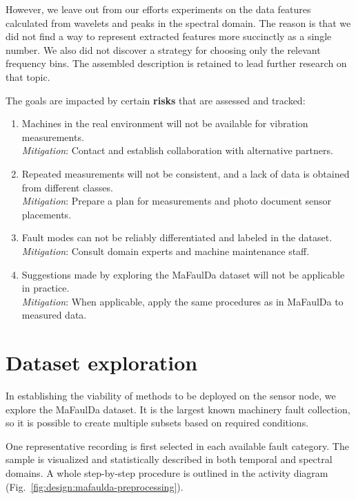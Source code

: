 However, we leave out from our efforts experiments on the data features calculated from wavelets and peaks in the spectral domain. The reason is that we did not find a way to represent extracted features more succinctly as a single number. We also did not discover a strategy for choosing only the relevant frequency bins. The assembled description is retained to lead further research on that topic.

The goals are impacted by certain \textbf{risks} that are assessed and tracked:

\begin{enumerate}[label=R-\arabic*., font=\bfseries]
\itemsep0pt
\item Machines in the real environment will not be available for vibration measurements. \\ \emph{Mitigation}: Contact and establish collaboration with alternative partners. 
\item Repeated measurements will not be consistent, and a lack of data is obtained from different classes.
\\ \emph{Mitigation}: Prepare a plan for measurements and photo document sensor placements. 
\item Fault modes can not be reliably differentiated and labeled in the dataset.
\\ \emph{Mitigation}: Consult domain experts and machine maintenance staff.
\item Suggestions made by exploring the MaFaulDa dataset will not be applicable in practice. \\
\emph{Mitigation}: When applicable, apply the same procedures as in MaFaulDa to measured data.
\end{enumerate}


\section{Dataset exploration}
In establishing the viability of methods to be deployed on the sensor node, we explore the MaFaulDa dataset. It is the largest known machinery fault collection, so it is possible to create multiple subsets based on required conditions. 

One representative recording is first selected in each available fault category. The sample is visualized and statistically described in both temporal and spectral domains. A whole step-by-step procedure is outlined in the activity diagram (Fig.~\ref{fig:design:mafaulda-preprocessing}).

